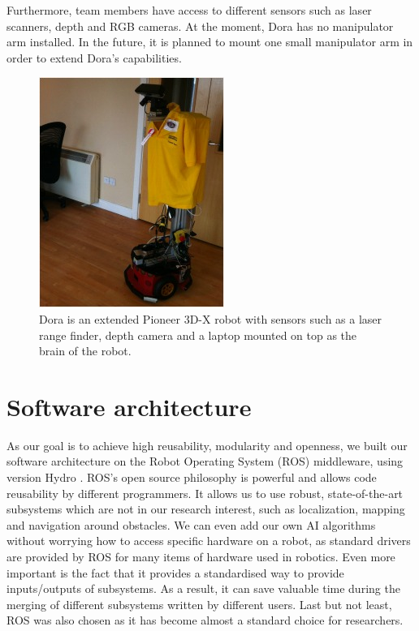 \documentclass[conference]{IEEEtran}
\begin{document}
Furthermore, team members have access to different sensors such as laser scanners, depth and RGB cameras. At the moment, Dora has no manipulator arm installed. In the future, it is planned to mount one small manipulator arm in order to extend Dora's capabilities.

\begin{figure}[!t]
\centering
\includegraphics[width=3.in]{dorafinal.jpg}
\caption{Dora is an extended Pioneer 3D-X robot with sensors such as a laser range finder, depth camera and a laptop mounted on top as the brain of the robot.}
\label{fig:dora}
\end{figure}

\section{Software architecture}
As our goal is to achieve high reusability, modularity and openness, we built our software architecture on the Robot Operating System (ROS) middleware, using version Hydro \cite{ros}. ROS's open source philosophy is powerful and allows code reusability by different programmers. It allows us to use robust, state-of-the-art subsystems which are not in our research interest, such as localization, mapping and navigation around obstacles. We can even add our own AI algorithms without worrying how to access specific hardware on a robot, as standard drivers are provided by ROS for many items of hardware used in robotics. Even more important is the fact that it provides a standardised way to provide inputs/outputs of subsystems. As a result, it can save valuable time during the merging of different subsystems written by different users. Last but not least, ROS was also chosen as it has become almost a standard choice for researchers.
\end{document}
